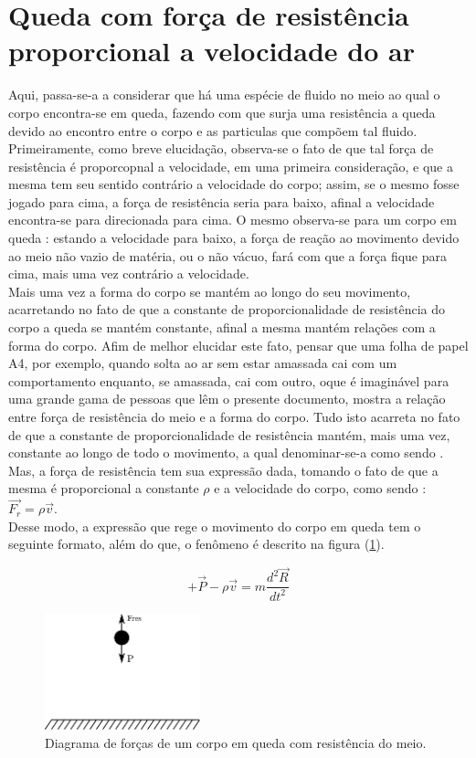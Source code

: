 \documentclass[DIV=calc, paper=a4, fontsize=11pt, twocolumn]{scrartcl}	 %
\begin{document}
\newpage

\section*{Queda com força de resistência proporcional a velocidade do ar}
Aqui, passa-se-a a considerar que há uma espécie de fluido no meio ao qual o corpo encontra-se em queda, fazendo com que surja uma resistência a queda devido
ao encontro entre o corpo e as particulas que compõem tal fluido. Primeiramente, como breve elucidação, observa-se o fato de que tal força de resistência é proporcopnal
a velocidade, em uma primeira consideração, e que a mesma tem seu sentido contrário a velocidade do corpo; assim, se o mesmo fosse jogado para cima, a força de resistência
seria para baixo, afinal a velocidade encontra-se para direcionada para cima. O mesmo observa-se para um corpo em queda : estando a velocidade para baixo, a força
de reação ao movimento devido ao meio não vazio de matéria, ou o não vácuo, fará com que a força fique para cima, mais uma vez contrário a velocidade.\\
Mais uma vez a forma do corpo se mantém ao longo do seu movimento, acarretando no fato de que a constante de proporcionalidade de resistência do corpo a queda 
se mantém constante, afinal a mesma mantém relações com a forma do corpo. Afim de melhor elucidar este fato, pensar que uma folha de papel A4, por exemplo, quando
solta ao ar sem estar amassada cai com um comportamento enquanto, se amassada, cai com outro, oque é imaginável para uma grande gama de pessoas que lêm o presente 
documento, mostra a relação entre força de resistência do meio e a forma do corpo. Tudo isto acarreta no fato de que a constante de proporcionalidade de resistência 
mantém, mais uma vez, constante ao longo de todo o movimento, a qual denominar-se-a como sendo \pho.\\
Mas, a força de resistência tem sua expressão dada, tomando o fato de que a mesma é proporcional a constante $\rho$ e a velocidade do corpo, como sendo : $\vec{F_{r}}=\rho \vec{v}$.\\
Desse modo, a expressão que rege o movimento do corpo em queda tem o seguinte formato, além do que, o fenômeno é descrito na figura (\ref{fig:queda_livre_com_resistencia}).
  
\begin{equation}
 +\vec{P}-\rho \vec{v}=m\frac{d^2\vec{R}}{dt^2}
\end{equation}

\begin{figure}[h!]
\centering
\includegraphics[width=0.4\textwidth]{queda_livre_com_resistencia}
\caption{Diagrama de forças de um corpo em queda com resistência do meio.}
\label{fig:queda_livre_com_resistencia}
\end{figure}
\end{document}
